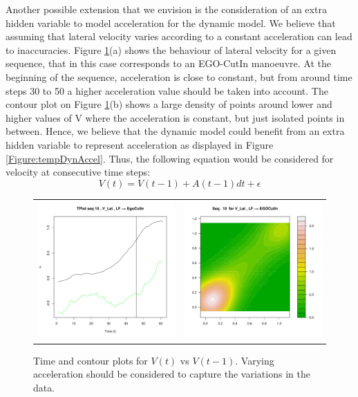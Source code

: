 Another possible extension that we envision is the consideration of an extra hidden variable to model acceleration for the dynamic model. We believe that assuming that lateral velocity varies according to a constant acceleration can lead to inaccuracies. Figure \ref{Figure:daimlerVel}(a) shows the behaviour of lateral velocity for a given sequence, that in this case corresponds to an EGO-CutIn manoeuvre. At the beginning of the sequence, acceleration is close to constant, but from around time steps 30 to 50 a higher acceleration value should be taken into account. The contour plot on Figure \ref{Figure:daimlerVel}(b) shows a large density of points around lower and higher values of V where the acceleration is constant, but just isolated points in between. Hence, we believe that the dynamic model could benefit from an extra hidden variable to represent acceleration as displayed in Figure \ref{Figure:tempDynAccel}. %
Thus, the following equation would be considered for velocity at consecutive time steps:
\begin{equation}
V(t) =V(t-1) +A(t-1)dt +\epsilon
\end{equation}

\begin{figure}
  \centering
  \setlength{\tabcolsep}{0.05pt}
  \renewcommand{\arraystretch}{0.02}
    \begin{tabular}{cc}
    \includegraphics[width=60mm]{figures/DaimlerLE_EGO_L_LE_OBJ_R_EGOCutInVel.pdf}&
    \includegraphics[width=60mm]{figures/DaimlerBivariate_temporal_analysisEGO_LVel.pdf}\\
  \end{tabular}
      \caption{ \label{Figure:daimlerVel}Time and contour plots for $V(t)$ vs $V(t-1)$. Varying acceleration should be considered to capture the variations in the data.}
\end{figure}

